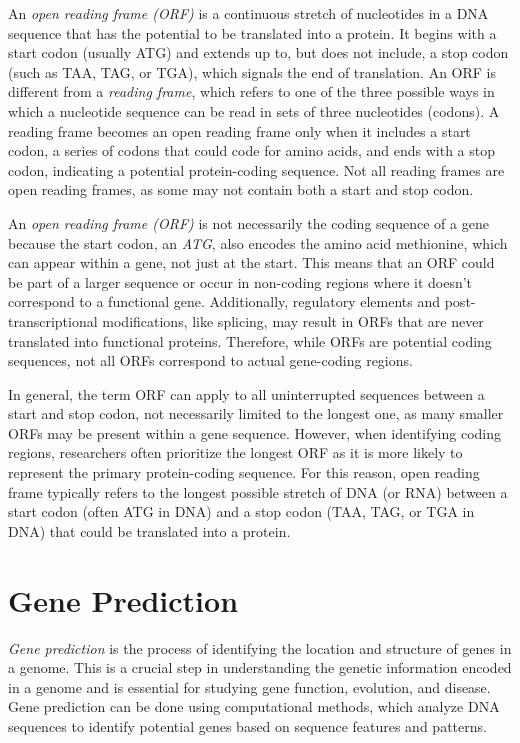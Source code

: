 An {\em open reading frame (ORF)} is a continuous stretch of nucleotides in a DNA sequence that has the potential to be translated into a protein. It begins with a start codon (usually ATG) and extends up to, but does not include, a stop codon (such as TAA, TAG, or TGA), which signals the end of translation. An ORF is different from a {\em reading frame}, which refers to one of the three possible ways in which a nucleotide sequence can be read in sets of three nucleotides (codons). A reading frame becomes an open reading frame only when it includes a start codon, a series of codons that could code for amino acids, and ends with a stop codon, indicating a potential protein-coding sequence. Not all reading frames are open reading frames, as some may not contain both a start and stop codon.

An {\em open reading frame (ORF)} is not necessarily the coding sequence of a gene because the start codon, an {\em ATG}, also encodes the amino acid methionine, which can appear within a gene, not just at the start. This means that an ORF could be part of a larger sequence or occur in non-coding regions where it doesn't correspond to a functional gene. Additionally, regulatory elements and post-transcriptional modifications, like splicing, may result in ORFs that are never translated into functional proteins. Therefore, while ORFs are potential coding sequences, not all ORFs correspond to actual gene-coding regions.


In general, the term ORF can apply to all uninterrupted sequences between a start and stop codon, not necessarily limited to the longest one, as many smaller ORFs may be present within a gene sequence. However, when identifying coding regions, researchers often prioritize the longest ORF as it is more likely to represent the primary protein-coding sequence. For this reason, open reading frame typically refers to the longest possible stretch of DNA (or RNA) between a start codon (often ATG in DNA) and a stop codon (TAA, TAG, or TGA in DNA) that could be translated into a protein. 

\section{Gene Prediction}

{\em Gene prediction} is the process of identifying the location and structure of genes in a genome. This is a crucial step in understanding the genetic information encoded in a genome and is essential for studying gene function, evolution, and disease. Gene prediction can be done using computational methods, which analyze DNA sequences to identify potential genes based on sequence features and patterns.

